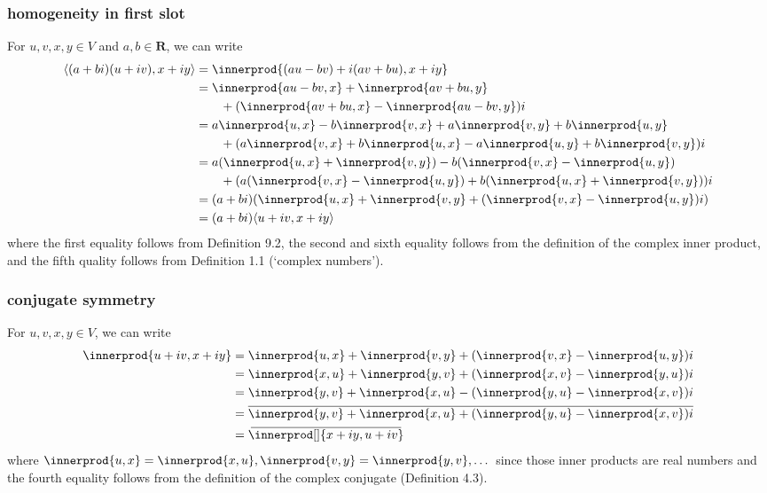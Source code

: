 \documentclass{article}
\DeclarePairedDelimiter{\innerprod}\langle\rangle
\newcommand\conjinnerp[2][]{\:\overline{\mkern-4mu\innerprod[#1]{#2}\mkern-4mu}\:}
\begin{document}
\subsubsection*{homogeneity in first slot}
For $u,v,x,y\in V$ and $a,b\in\textbf{R}$, we can write
\begin{align*}
    \langle (a+bi)(u+iv),x+iy\rangle&=\innerprod{(au-bv)+i(av+bu),x+iy}\\
    &=\innerprod{au-bv,x}+\innerprod{av+bu,y}\\
    &\qquad +(\innerprod{av+bu,x}-\innerprod{au-bv,y})i\\
    &=a\innerprod{u,x}-b\innerprod{v,x}+a\innerprod{v,y}+b\innerprod{u,y}\\
    &\qquad +(a\innerprod{v,x}+b\innerprod{u,x}-a\innerprod{u,y}+b\innerprod{v,y})i\\
    &=a(\innerprod{u,x}+\innerprod{v,y})-b(\innerprod{v,x}-\innerprod{u,y})\\
    &\qquad +(a(\innerprod{v,x}-\innerprod{u,y})+b(\innerprod{u,x}+\innerprod{v,y}))i\\
    &=(a+bi)(\innerprod{u,x}+\innerprod{v,y}+(\innerprod{v,x}-\innerprod{u,y})i)\\
    &=(a+bi)\langle u+iv,x+iy\rangle
\end{align*}
where the first equality follows from Definition 9.2, the second and sixth equality follows from the definition of the complex inner product, and the fifth quality follows from Definition 1.1 (`complex numbers').

\subsubsection*{conjugate symmetry}
For $u,v,x,y\in V$, we can write
\begin{align*}
    \innerprod{u+iv,x+iy}&=\innerprod{u,x} +\innerprod{v,y} + (\innerprod{v,x} - \innerprod{u,y})i\\
    &=\innerprod{x,u} +\innerprod{y,v} + (\innerprod{x,v} - \innerprod{y,u})i\\
    &=\innerprod{y,v} + \innerprod{x,u} - (\innerprod{y,u} - \innerprod{x,v})i\\
    &=\overline{\innerprod{y,v} + \innerprod{x,u} + (\innerprod{y,u} - \innerprod{x,v})i}\\
    &=\conjinnerp{x+iy,u+iv}
\end{align*}
where $\innerprod{u,x}=\innerprod{x,u},\innerprod{v,y}=\innerprod{y,v},\dots$ since those inner products are real numbers and the fourth equality follows from the definition of the complex conjugate (Definition 4.3).
\end{document}

